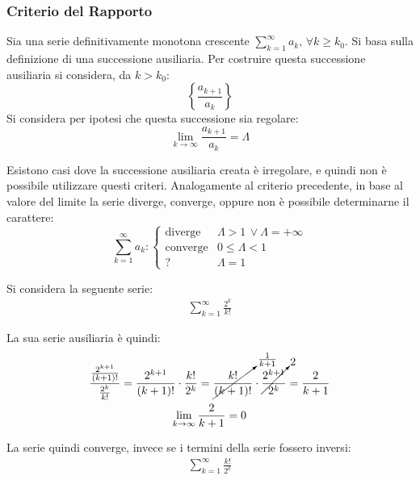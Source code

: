 \documentclass{article}
\numberwithin{equation}{subsection}
\begin{document}
\subsubsection{Criterio del Rapporto}

Sia una serie definitivamente monotona crescente $\sum_{k=1}^\infty a_k,\,\forall k\geq k_0$. 
Si basa sulla definizione di una successione ausiliaria. Per costruire questa successione ausiliaria si considera, da $k>k_0$:
\begin{equation*}
    \displaystyle\left\{\frac{a_{k+1}}{a_k}\right\}
\end{equation*}
Si considera per ipotesi che questa successione sia regolare:
\begin{equation*}
    \lim_{k\to\infty}\displaystyle\frac{a_{k+1}}{a_k}=\Lambda
\end{equation*}

Esistono casi dove la successione ausiliaria creata è irregolare, e quindi non è possibile utilizzare questi criteri. %
Analogamente al criterio precedente, in base al valore del limite la serie diverge, converge, oppure non è possibile determinarne il carattere:
\begin{equation}
    \displaystyle\sum_{k=1}^\infty a_k:\begin{cases}
        \text{diverge}&\Lambda > 1\,\lor\Lambda=+\infty\\
        \text{converge}&0\leq\Lambda<1\\
        ?&\Lambda=1
    \end{cases}
\end{equation}


Si considera la seguente serie:
\begin{gather*}
    \displaystyle\sum_{k=1}^\infty\frac{2^k}{k!}
\end{gather*}

La sua serie ausiliaria è quindi:
\begin{gather*}
    \displaystyle\frac{\frac{2^{k+1}}{(k+1)!}}{\frac{2^k}{k!}}=
    \frac{2^{k+1}}{(k+1)!}\cdot\frac{k!}{2^k}=\cancelto{\frac{1}{k+1}}{\frac{k!}{(k+1)!}}\cdot\cancelto{2}{\frac{2^{k+1}}{2^k}}=\frac{2}{k+1}\\
    \lim_{k\to\infty}\frac{2}{k+1}=0
\end{gather*}

La serie quindi converge, invece se i termini della serie fossero inversi:
\begin{gather*}
    \displaystyle\sum_{k=1}^\infty\frac{k!}{2^k}
\end{gather*}
\end{document}
